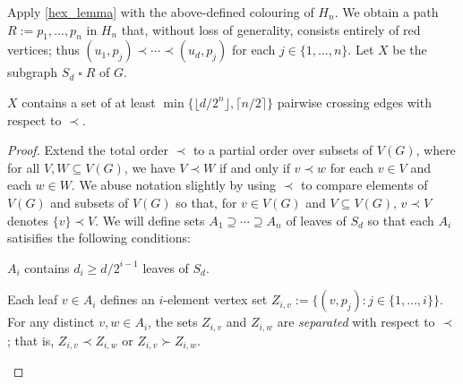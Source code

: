 \documentclass[kpfonts]{patmorin}
\renewcommand{\ge}{\geqslant}
\newcommand{\CartProd}{\mathbin{\square}}
\begin{document}
Apply \cref{hex_lemma} with the above-defined colouring of $H_n$. We obtain a path $R:=p_1,\ldots,p_n$ in $H_n$ that, without loss of generality, consists entirely of red vertices;
thus $(u_1,p_j)\prec\cdots\prec (u_d,p_j)$ for each $j\in\{1,\ldots,n\}$.  Let $X$ be the subgraph $S_d \CartProd R$ of $G$.

\begin{lem}\label{twister}
$X$ contains a set of at least $\min\{\lfloor d/2^{n}\rfloor,\lceil n/2\rceil\}$ pairwise crossing edges with respect to $\prec$.
\end{lem}

\begin{proof}
	Extend the total order $\prec$ to a partial order over subsets of $V(G)$, where for all $V,W\subseteq V(G)$, we have $V\prec W$ if and only if $v\prec w$ for each $v\in V$ and each $w\in W$.  We abuse notation slightly by using $\prec$ to compare elements of $V(G)$ and subsets of $V(G)$ so that, for $v\in V(G)$ and $V\subseteq V(G)$, $v\prec V$ denotes $\{v\}\prec V$.
    We will define sets $A_1\supseteq \cdots\supseteq A_{n}$ of leaves of $S_d$ so that each $A_i$ satisifies the following conditions:
    \begin{compactenum}[(C1)]
        \item $A_i$ contains $d_i\ge d/2^{i-1}$ leaves of $S_d$.
        \item Each leaf $v\in A_i$ defines an $i$-element vertex set $Z_{i,v}:=\{(v,p_j):j\in\{1,\ldots,i\}\}$.  For any distinct $v,w\in A_i$, the sets $Z_{i,v}$ and $Z_{i,w}$ are \emph{separated} with respect to $\prec$; that is, $Z_{i,v}\prec Z_{i,w}$ or $Z_{i,v}\succ Z_{i,w}$.
    \end{compactenum}


\end{proof}
\end{document}
